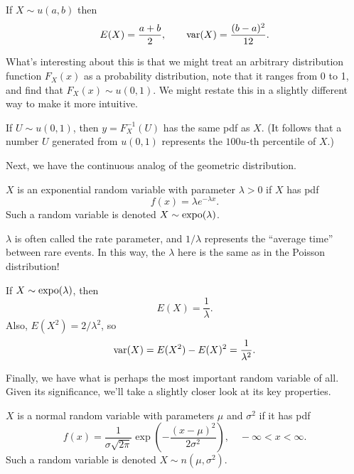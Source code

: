 \documentclass[../m157main.tex]{subfiles}
\begin{document}
\begin{theorem}
    If $X \sim u(a,b)$ then
    \[ E(X) = \frac{a+b}{2}, \qquad \textrm{var}(X) = \frac{(b-a)^2}{12}. \]
\end{theorem}

What's interesting about this is that we might treat an arbitrary distribution function $F_X(x)$ as a probability distribution, note that it ranges from 0 to 1, and find that $F_X(x) \sim u(0,1)$.
We might restate this in a slightly different way to make it more intuitive.

\begin{theorem}[]
    If $U \sim u(0,1)$, then $y = F_X^{-1}(U)$ has the same pdf as $X$.
    (It follows that a number $U$ generated from $u(0,1)$ represents the $100u$-th percentile of $X$.)
\end{theorem}

Next, we have the continuous analog of the geometric distribution.

\begin{definition}
    $X$ is an exponential random variable with parameter $\lambda > 0$ if $X$ has pdf
    \[ f(x) = \lambda e^{-\lambda x}. \]
    Such a random variable is denoted $X \sim \textrm{expo}(\lambda)$.
\end{definition}

$\lambda$ is often called the rate parameter, and $1 / \lambda$ represents the ``average time'' between rare events.
In this way, the $\lambda$ here is the same as in the Poisson distribution!

\begin{theorem}
    If $X \sim \textrm{expo}(\lambda)$, then
    \[ E(X) = \frac{1}{\lambda}. \]
    Also, $E(X^2) = 2 / \lambda^2$, so
    \[ \textrm{var}(X) = E(X^2) - E(X)^2 = \frac{1}{\lambda^2}. \]
\end{theorem}

Finally, we have what is perhaps the most important random variable of all.
Given its significance, we'll take a slightly closer look at its key properties.

\begin{definition}
    $X$ is a normal random variable with parameters $\mu$ and $\sigma^2$ if it has pdf
    \[ f(x) = \frac{1}{\sigma \sqrt{2\pi}} \exp \left( -\frac{(x-\mu)^2}{2\sigma^2} \right), \quad -\infty < x < \infty. \]
    Such a random variable is denoted $X \sim n(\mu, \sigma^2)$.
\end{definition}
\end{document}
